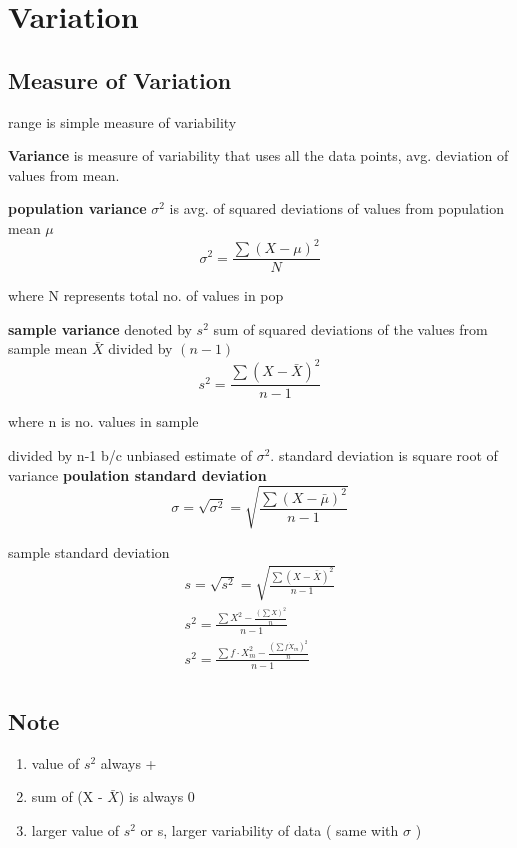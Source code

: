 \documentclass[11pt]{amsart}
\begin{document}
\section{Variation}
\subsection{Measure of Variation}
\par range is simple measure of variability
\par \textbf{Variance} is measure of variability that uses all the data points, avg. deviation of values from mean.
\par \textbf{population variance} $\sigma^2$ is avg. of squared deviations of values from population mean $\mu$
\begin{equation}
  \sigma^2 = \frac{\sum{(X-\mu)^2}}{N}
\end{equation}
\par where N represents total no. of values in pop
\par \textbf{sample variance} denoted by $s^2$ sum of squared deviations of the values from sample mean $\bar{X}$ divided by $(n-1)$
\begin{equation}
  s^2 = \frac {\sum{(X-\bar{X})^2}}{n-1}
\end{equation}
\par where n is no. values in sample
\par divided by n-1  b/c unbiased estimate of $\sigma^2$. standard deviation is square root of variance
\textbf{poulation standard deviation}
\begin{equation}
  \sigma  = \sqrt{\sigma^2} = \sqrt {\frac{\sum{(X-\bar{\mu})^2}}{n-1}}
\end{equation}
\par sample standard deviation
\begin{equation}
  \begin{split}
    s  = \sqrt{s^2} = \sqrt {\frac{\sum{(X-\bar{X})^2}}{n-1}} \\
    s^2 = \frac{\sum{X^2 - \frac{(\sum X)^2}{n}}}{n-1} \\
    s^2 = \frac{\sum{f \cdot X_m^2 - \frac{(\sum f \dot X_m)^2}{n}}}{n-1} \\
  \end{split}
\end{equation}
\subsection{Note}
\begin{enumerate}
  \item value of $s^2$ always +
  \item sum of (X - $\bar{X}$) is always 0
  \item larger value of $s^2$ or s, larger variability of data ( same with $\sigma$ )
\end{enumerate}
\end{document}
